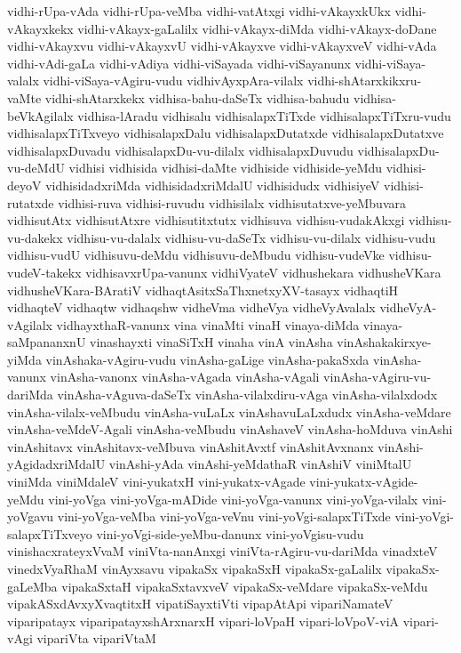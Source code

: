 {vidhi-rUpa-vAda
vidhi-rUpa-veMba
vidhi-vatAtxgi
vidhi-vAkayxkUkx
vidhi-vAkayxkekx
vidhi-vAkayx-gaLalilx
vidhi-vAkayx-diMda
vidhi-vAkayx-doDane
vidhi-vAkayxvu
vidhi-vAkayxvU
vidhi-vAkayxve
vidhi-vAkayxveV
vidhi-vAda
vidhi-vAdi-gaLa
vidhi-vAdiya
vidhi-viSayada
vidhi-viSayanunx
vidhi-viSaya-valalx
vidhi-viSaya-vAgiru-vudu
vidhivAyxpAra-vilalx
vidhi-shAtarxkikxru-vaMte
vidhi-shAtarxkekx
vidhisa-bahu-daSeTx
vidhisa-bahudu
vidhisa-beVkAgilalx
vidhisa-lAradu
vidhisalu
vidhisalapxTiTxde
vidhisalapxTiTxru-vudu
vidhisalapxTiTxveyo
vidhisalapxDalu
vidhisalapxDutatxde
vidhisalapxDutatxve
vidhisalapxDuvadu
vidhisalapxDu-vu-dilalx
vidhisalapxDuvudu
vidhisalapxDu-vu-deMdU
vidhisi
vidhisida
vidhisi-daMte
vidhiside
vidhiside-yeMdu
vidhisi-deyoV
vidhisidadxriMda
vidhisidadxriMdalU
vidhisidudx
vidhisiyeV
vidhisi-rutatxde
vidhisi-ruva
vidhisi-ruvudu
vidhisilalx
vidhisutatxve-yeMbuvara
vidhisutAtx
vidhisutAtxre
vidhisutitxtutx
vidhisuva
vidhisu-vudakAkxgi
vidhisu-vu-dakekx
vidhisu-vu-dalalx
vidhisu-vu-daSeTx
vidhisu-vu-dilalx
vidhisu-vudu
vidhisu-vudU
vidhisuvu-deMdu
vidhisuvu-deMbudu
vidhisu-vudeVke
vidhisu-vudeV-takekx
vidhisavxrUpa-vanunx
vidhiVyateV
vidhushekara
vidhusheVKara
vidhusheVKara-BAratiV
vidhaqtAsitxSaThxnetxyXV-tasayx
vidhaqtiH
vidhaqteV
vidhaqtw
vidhaqshw
vidheVma
vidheVya
vidheVyAvalalx
vidheVyA-vAgilalx
vidhayxthaR-vanunx
vina
vinaMti
vinaH
vinaya-diMda
vinaya-saMpananxnU
vinashayxti
vinaSiTxH
vinaha
vinA
vinAsha
vinAshakakirxye-yiMda
vinAshaka-vAgiru-vudu
vinAsha-gaLige
vinAsha-pakaSxda
vinAsha-vanunx
vinAsha-vanonx
vinAsha-vAgada
vinAsha-vAgali
vinAsha-vAgiru-vu-dariMda
vinAsha-vAguva-daSeTx
vinAsha-vilalxdiru-vAga
vinAsha-vilalxdodx
vinAsha-vilalx-veMbudu
vinAsha-vuLaLx
vinAshavuLaLxdudx
vinAsha-veMdare
vinAsha-veMdeV-Agali
vinAsha-veMbudu
vinAshaveV
vinAsha-hoMduva
vinAshi
vinAshitavx
vinAshitavx-veMbuva
vinAshitAvxtf
vinAshitAvxnanx
vinAshi-yAgidadxriMdalU
vinAshi-yAda
vinAshi-yeMdathaR
vinAshiV
viniMtalU
viniMda
viniMdaleV
vini-yukatxH
vini-yukatx-vAgade
vini-yukatx-vAgide-yeMdu
vini-yoVga
vini-yoVga-mADide
vini-yoVga-vanunx
vini-yoVga-vilalx
vini-yoVgavu
vini-yoVga-veMba
vini-yoVga-veVnu
vini-yoVgi-salapxTiTxde
vini-yoVgi-salapxTiTxveyo
vini-yoVgi-side-yeMbu-danunx
vini-yoVgisu-vudu
vinishacxrateyxVvaM
viniVta-nanAnxgi
viniVta-rAgiru-vu-dariMda
vinadxteV
vinedxVyaRhaM
vinAyxsavu
vipakaSx
vipakaSxH
vipakaSx-gaLalilx
vipakaSx-gaLeMba
vipakaSxtaH
vipakaSxtavxveV
vipakaSx-veMdare
vipakaSx-veMdu
vipakASxdAvxyXvaqtitxH
vipatiSayxtiVti
vipapAtApi
vipariNamateV
viparipatayx
viparipatayxshArxnarxH
vipari-loVpaH
vipari-loVpoV-viA
vipari-vAgi
vipariVta
vipariVtaM
}
